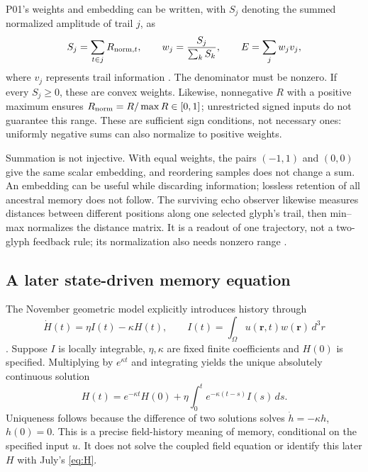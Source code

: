 \documentclass[11pt,a4paper]{article}
\theoremstyle{definition}
\numberwithin{equation}{section}
\begin{document}
P01's weights and embedding can be written, with $S_j$ denoting the
summed normalized amplitude of trail $j$, as
\begin{equation}
 S_j=\sum_{t\in j}R_{{\rm norm},t},\qquad
 w_j=\frac{S_j}{\sum_kS_k},\qquad E=\sum_jw_jv_j,
 \label{eq:embedding}
\end{equation}
where $v_j$ represents trail information
\cite[physical p.~7, \S3.5]{P01}.
The denominator must be nonzero. If every $S_j\geq0$, these are convex
weights. Likewise, nonnegative $R$ with a positive maximum ensures
$R_{\rm norm}=R/\max R\in[0,1]$; unrestricted signed inputs do not
guarantee this range. These are sufficient sign conditions, not necessary
ones: uniformly negative sums can also normalize to positive weights.

Summation is not injective. With equal weights, the pairs $(-1,1)$ and
$(0,0)$ give the same scalar embedding, and reordering samples does not
change a sum. An embedding can be useful while discarding information;
lossless retention of all ancestral memory does not follow.
The surviving echo observer likewise measures distances between different
positions along one selected glyph's trail, then min--max normalizes the
distance matrix. It is a readout of one trajectory, not a two-glyph feedback
rule; its normalization also needs nonzero range
\cite[lines 10--43]{Echo}.

\subsection{A later state-driven memory equation}

The November geometric model explicitly introduces history through
\begin{equation}
 \dot H(t)=\eta I(t)-\kappa H(t),\qquad
 I(t)=\int_\Omega u(\mathbf r,t)w(\mathbf r)\,d^3r
 \label{eq:memory-ode}
\end{equation}
\cite[physical pp.~5,17, Eqs.~(10),(25)]{P14}.
Suppose $I$ is locally integrable, $\eta,\kappa$ are fixed finite
coefficients and $H(0)$ is specified. Multiplying by $e^{\kappa t}$ and
integrating yields the unique absolutely continuous solution
\begin{equation}
 H(t)=e^{-\kappa t}H(0)
       +\eta\int_0^t e^{-\kappa(t-s)}I(s)\,ds.
 \label{eq:memory-solution}
\end{equation}
Uniqueness follows because the difference of two solutions solves
$\dot h=-\kappa h$, $h(0)=0$.
This is a precise field-history meaning of memory, conditional on the
specified input $u$. It does not solve the coupled field equation or
identify this later $H$ with July's \eqref{eq:H}.
\end{document}
